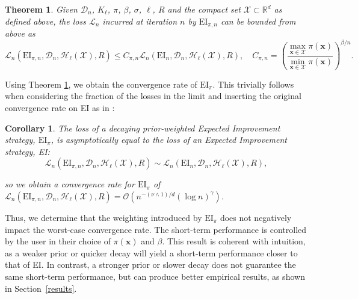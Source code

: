 \documentclass{article}
\newcommand{\pri}[0]{{\pi}}
\newcommand{\pei}[0]{$\text{EI}_\pi$}
\newcommand{\xinx}[0]{\bm{x}\in\mathcal{X}}
\newtheorem{theorem}{Theorem}
\newtheorem{corollary}{Corollary}
\begin{document}
\begin{theorem} \label{th1}
Given $\mathcal{D}_n$, $K_{\bm{\ell}}$, $\pri$, $\beta$, $\sigma$, ${\bm{\ell}}$, $R$ and the compact set $\mathcal{X}\subset\mathbb{R}^d$ as defined above, the loss $\mathcal{L}_{n}$ incurred at iteration $n$ by $\text{EI}_{\pri, n}$
can be bounded from above as
\begin{equation}
    \mathcal{L}_{n}(\text{EI}_{\pri, n}, \mathcal{D}_n, \mathcal{H}_{\bm{\ell}}(\mathcal{X}), R) \leq C_{\pi, n} \mathcal{L}_{n}(\text{EI}_n, \mathcal{D}_n, \mathcal{H}_{\bm{\ell}}(\mathcal{X}), R), \quad C_{\pi, n} = \left(\frac{\max_{\xinx} \pi(\bm{x})}{\min_{\xinx} \pi(\bm{x})}\right)^{\beta/n}.
\end{equation}
\end{theorem}  

Using Theorem \ref{th1}, we obtain the convergence rate of \pei{}. This trivially follows 
when considering the fraction of the losses in the limit and inserting the original convergence rate on EI as in \citet{JMLR:v12:bull11a}:

\begin{corollary} The loss of a decaying prior-weighted Expected Improvement strategy, \pei{}, is asymptotically equal to the loss of an Expected Improvement strategy, EI:
\begin{equation}
    \mathcal{L}_{n}(\text{EI}_{\pri, n}, \mathcal{D}_n, \mathcal{H}_{\bm{\ell}}(\mathcal{X}), R) \sim  \mathcal{L}_{n}(\text{EI}_n, \mathcal{D}_n, \mathcal{H}_{\bm{\ell}}(\mathcal{X}), R),
\end{equation}

so we obtain a convergence rate for \pei{} of $\mathcal{L}_{n}(\text{EI}_{\pri, n}, \mathcal{D}_n, \mathcal{H}_{\bm{\ell}}(\mathcal{X}), R) = \mathcal{O}(n^{-(\nu \land 1)/d}(\log n)^\gamma)$.
\end{corollary}

Thus, we determine that the weighting introduced by \pei{} does not negatively impact the worst-case convergence rate. The short-term performance is controlled by the user in their choice of $\pri(\bm{x})$ and $\beta$. This result is coherent with intuition, as a weaker prior or quicker decay will yield a short-term performance closer to that of EI. In contrast, a stronger prior or slower decay does not guarantee the same short-term performance, but can produce better empirical results, as shown in Section~\ref{results}.
\end{document}

